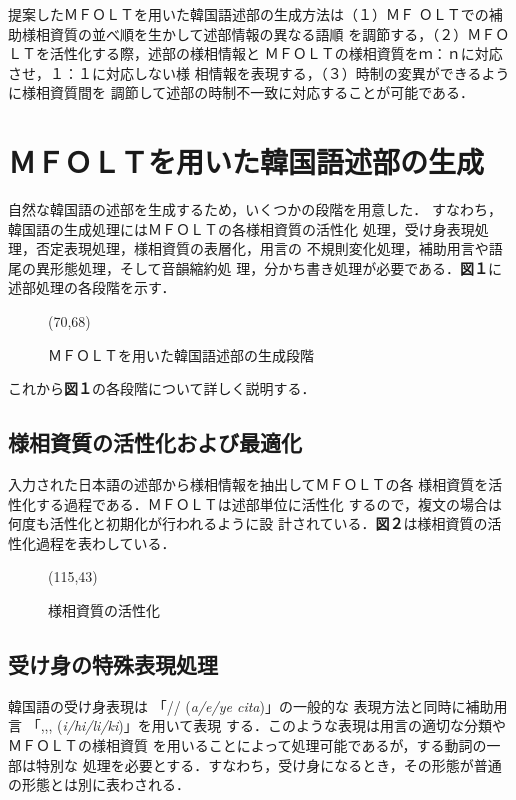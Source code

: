 提案したＭＦＯＬＴを用いた韓国語述部の生成方法は（１）ＭＦ
ＯＬＴでの補助様相資質の並べ順を生かして述部情報の異なる語順
を調節する，（２）ＭＦＯＬＴを活性化する際，述部の様相情報と
ＭＦＯＬＴの様相資質をｍ：ｎに対応させ，１：１に対応しない様
相情報を表現する，（３）時制の変異ができるように様相資質間を
調節して述部の時制不一致に対応することが可能である．

\section{ＭＦＯＬＴを用いた韓国語述部の生成}
自然な韓国語の述部を生成するため，いくつかの段階を用意した．
すなわち，韓国語の生成処理にはＭＦＯＬＴの各様相資質の活性化
処理，受け身表現処理，否定表現処理，様相資質の表層化，用言の
不規則変化処理，補助用言や語尾の異形態処理，そして音韻縮約処
理，分かち書き処理が必要である．{\bf 図１}に述部処理の各段階を示す．

\clearpage

\begin{figure}[htb]
\atari(70,68)
\caption{ＭＦＯＬＴを用いた韓国語述部の生成段階}
\end{figure}

これから{\bf 図１}の各段階について詳しく説明する．

\subsection{様相資質の活性化および最適化}

入力された日本語の述部から様相情報を抽出してＭＦＯＬＴの各
様相資質を活性化する過程である．ＭＦＯＬＴは述部単位に活性化
するので，複文の場合は何度も活性化と初期化が行われるように設
計されている．{\bf 図２}は様相資質の活性化過程を表わしている．

\begin{figure}[htb]
\atari(115,43)
\caption{様相資質の活性化}
\end{figure}

\subsection{受け身の特殊表現処理}
韓国語の受け身表現は
「//  ({\it a/e/ye cita})」の一般的な
表現方法と同時に補助用言
「,,, ({\it i/hi/li/ki})」を用いて表現
する．このような表現は用言の適切な分類やＭＦＯＬＴの様相資質
を用いることによって処理可能であるが，する動詞の一部は特別な
処理を必要とする．すなわち，受け身になるとき，その形態が普通
の形態とは別に表わされる．


